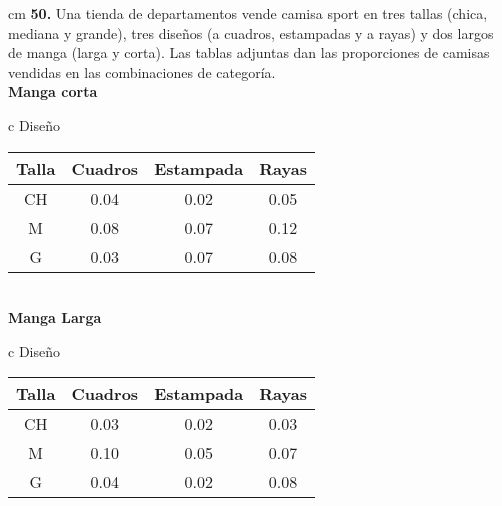 \documentclass[12pt, letterpaper, spanish]{article}
\begin{document}
 cm
\textbf{50.} Una tienda de departamentos vende camisa sport en tres tallas (chica, mediana y grande), tres diseños (a cuadros, estampadas y a rayas) y dos largos de manga (larga y corta). Las tablas adjuntas dan las proporciones de camisas vendidas en las combinaciones de categoría.\\

\textbf{Manga corta}\\
\begin{tabular}{c}
    \hline
    Diseño \\
    \begin{tabular}{cccc}
        \hline
        Talla & Cuadros & Estampada & Rayas\\ \hline
        CH & 0.04 & 0.02 & 0.05\\
        M & 0.08 & 0.07 & 0.12\\
        G & 0.03 & 0.07 & 0.08
    \end{tabular}
\end{tabular}\\

\textbf{Manga Larga}\\
\begin{tabular}{c}
    \hline
    Diseño \\
    \begin{tabular}{cccc}
        \hline
        Talla & Cuadros & Estampada & Rayas\\ \hline
        CH & 0.03 & 0.02 & 0.03\\
        M & 0.10 & 0.05 & 0.07\\
        G & 0.04 & 0.02 & 0.08
    \end{tabular}
\end{tabular}
\end{document}
